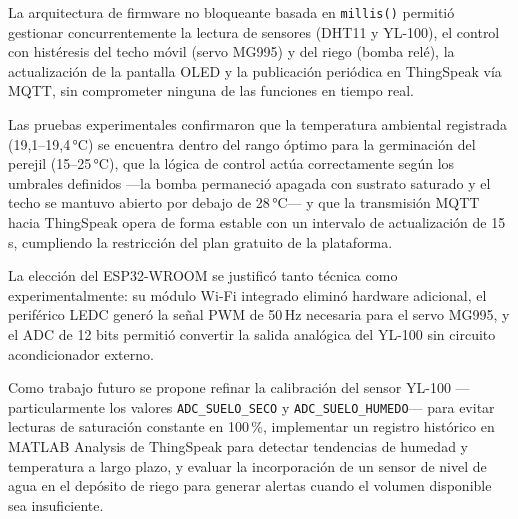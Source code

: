 La arquitectura de firmware no bloqueante basada en \texttt{millis()} permitió gestionar concurrentemente la lectura de sensores (DHT11 y YL-100), el control con histéresis del techo móvil (servo MG995) y del riego (bomba relé), la actualización de la pantalla OLED y la publicación periódica en ThingSpeak vía MQTT, sin comprometer ninguna de las funciones en tiempo real.

Las pruebas experimentales confirmaron que la temperatura ambiental registrada (19,1--19,4\,°C) se encuentra dentro del rango óptimo para la germinación del perejil (15--25\,°C), que la lógica de control actúa correctamente según los umbrales definidos —la bomba permaneció apagada con sustrato saturado y el techo se mantuvo abierto por debajo de 28\,°C— y que la transmisión MQTT hacia ThingSpeak opera de forma estable con un intervalo de actualización de 15\,s, cumpliendo la restricción del plan gratuito de la plataforma.

La elección del ESP32-WROOM se justificó tanto técnica como experimentalmente: su módulo Wi-Fi integrado eliminó hardware adicional, el periférico LEDC generó la señal PWM de 50\,Hz necesaria para el servo MG995, y el ADC de 12 bits permitió convertir la salida analógica del YL-100 sin circuito acondicionador externo.

Como trabajo futuro se propone refinar la calibración del sensor YL-100 —particularmente los valores \texttt{ADC\_SUELO\_SECO} y \texttt{ADC\_SUELO\_HUMEDO}— para evitar lecturas de saturación constante en 100\,\%, implementar un registro histórico en MATLAB Analysis de ThingSpeak para detectar tendencias de humedad y temperatura a largo plazo, y evaluar la incorporación de un sensor de nivel de agua en el depósito de riego para generar alertas cuando el volumen disponible sea insuficiente.